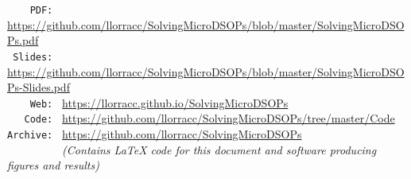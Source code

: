 \documentclass[titlepage]{\econtex}
\begin{document}
\begin{footnotesize}
    \begin{center}
      \begin{tabbing}
        \texttt{~~~~PDF:~} \= \= \url{https://github.com/llorracc/SolvingMicroDSOPs/blob/master/SolvingMicroDSOPs.pdf}  \\  %
        \texttt{~Slides:~} \> \> \url{https://github.com/llorracc/SolvingMicroDSOPs/blob/master/SolvingMicroDSOPs-Slides.pdf} \\
        \texttt{~~~~Web:~} \> \> \url{https://llorracc.github.io/SolvingMicroDSOPs} \\
        \texttt{~~~Code:~} \> \> \url{https://github.com/llorracc/SolvingMicroDSOPs/tree/master/Code} \\
        \texttt{Archive:~} \> \> \url{https://github.com/llorracc/SolvingMicroDSOPs}\\ 
        \texttt{~~~~~~~~~} \> \> \textit{(Contains LaTeX code for this document and software producing figures and results)}
      \end{tabbing}
    \end{center}
\end{footnotesize}

\begin{authorsinfo}
\end{authorsinfo}
\end{document}
